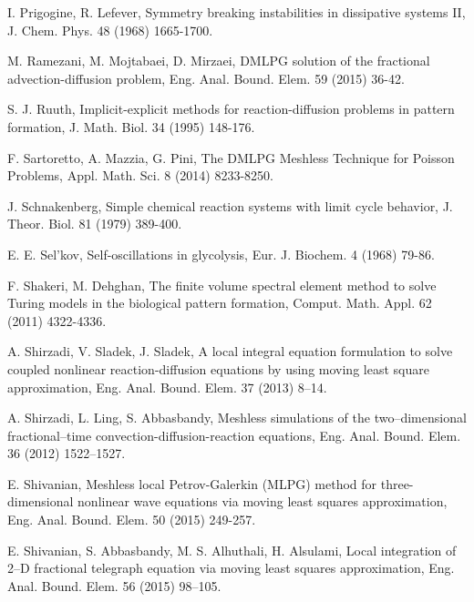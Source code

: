 \documentclass[12pt]{article}
\numberwithin{equation}{section}
\begin{document}
\begin{thebibliography}{99}
 I. Prigogine, R. Lefever, Symmetry breaking instabilities in dissipative systems II, J. Chem. Phys. 48 (1968) 1665-1700.

 M. Ramezani, M. Mojtabaei, D. Mirzaei, DMLPG solution of the fractional advection-diffusion problem,
 Eng. Anal. Bound. Elem. 59 (2015) 36-42.

 S. J. Ruuth, Implicit-explicit methods for reaction-diffusion problems in pattern formation, J. Math. Biol. 34 (1995) 148-176.

 F. Sartoretto, A. Mazzia, G. Pini, The DMLPG Meshless Technique for Poisson Problems, Appl. Math. Sci. 8 (2014) 8233-8250.

 J. Schnakenberg, Simple chemical reaction systems with limit cycle behavior, J. Theor. Biol. 81 (1979) 389-400.


 E. E. Sel'kov, Self-oscillations in glycolysis, Eur. J. Biochem. 4 (1968) 79-86.

 F. Shakeri, M. Dehghan, The finite volume spectral element method to solve Turing models in
the biological pattern formation, Comput. Math. Appl. 62 (2011) 4322-4336.


 A. Shirzadi, V. Sladek, J. Sladek, A local integral equation formulation to solve coupled nonlinear reaction-diffusion equations
by using moving least square approximation, Eng. Anal. Bound. Elem. 37 (2013) 8--14.

A. Shirzadi, L. Ling, S. Abbasbandy,  Meshless simulations of the two--dimensional fractional--time convection-diffusion-reaction
 equations,  Eng. Anal. Bound. Elem. 36 (2012) 1522--1527.


 E. Shivanian, Meshless local Petrov-Galerkin (MLPG) method for three-dimensional nonlinear wave equations via moving least squares approximation, Eng. Anal. Bound. Elem. 50 (2015) 249-257.

 E. Shivanian, S. Abbasbandy, M. S. Alhuthali, H. Alsulami,  Local integration of 2--D fractional telegraph equation via moving
least squares approximation, Eng. Anal. Bound. Elem. 56 (2015) 98--105.



\end{thebibliography}
\end{document}

